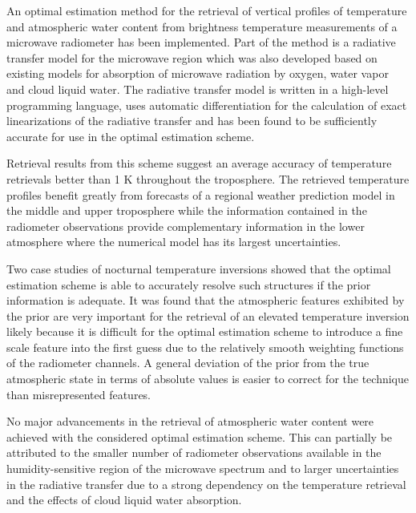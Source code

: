 \startsection[title=Conclusions]

    An optimal estimation method for the retrieval of vertical profiles of
    temperature and atmospheric water content from brightness temperature
    measurements of a microwave radiometer has been implemented. Part of the
    method is a radiative transfer model for the microwave region which was
    also developed based on existing models for absorption of microwave
    radiation by oxygen, water vapor and cloud liquid water. The radiative
    transfer model is written in a high-level programming language, uses
    automatic differentiation for the calculation of exact linearizations of the
    radiative transfer and has been found to be sufficiently accurate for use in
    the optimal estimation scheme.

    Retrieval results from this scheme suggest an average accuracy of
    temperature retrievals better than 1 K throughout the troposphere. The
    retrieved temperature profiles benefit greatly from forecasts of a
    regional weather prediction model in the middle and upper troposphere
    while the information contained in the radiometer observations provide
    complementary information in the lower atmosphere where the numerical model
    has its largest uncertainties.
    
    Two case studies of nocturnal temperature inversions showed that the
    optimal estimation scheme is able to accurately resolve such structures
    if the prior information is adequate. It was found that the atmospheric
    features exhibited by the prior are very important for the retrieval
    of an elevated temperature inversion likely because it is difficult for
    the optimal estimation scheme to introduce a fine scale feature into
    the first guess due to the relatively smooth weighting functions of the
    radiometer channels. A general deviation of the prior from the true
    atmospheric state in terms of absolute values is easier to correct
    for the technique than misrepresented features.

    No major advancements in the retrieval of atmospheric water content were
    achieved with the considered optimal estimation scheme.
    This can partially be attributed
    to the smaller number of radiometer observations available in the
    humidity-sensitive region of the microwave spectrum and to larger
    uncertainties in the radiative transfer due to a strong dependency on
    the temperature retrieval and the effects of cloud liquid water absorption.

